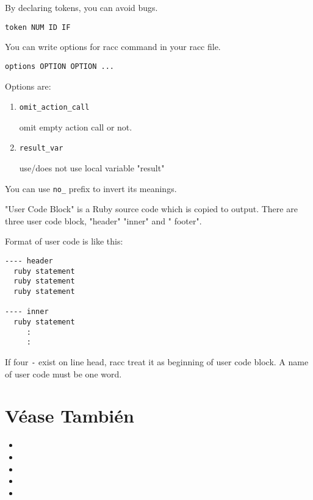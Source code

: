 By declaring tokens, you can avoid bugs. 

\begin{verbatim}
token NUM ID IF
\end{verbatim}


You can write options for racc command in your racc file.

\begin{verbatim}
options OPTION OPTION ...
\end{verbatim}
Options are:

\begin{enumerate}
\item
\begin{verbatim}
omit_action_call
\end{verbatim}
omit empty action call or not.

\item
\begin{verbatim}
result_var
\end{verbatim}
use/does not use local variable "result"
\end{enumerate}

You can use \verb'no_' prefix to invert its meanings.



"User Code Block" is a Ruby source code which is copied to output. There are three user code block, 
"header" 
"inner" 
and "
footer".

Format of user code is like this:

\begin{verbatim}
---- header
  ruby statement
  ruby statement
  ruby statement

---- inner
  ruby statement
     :
     :
\end{verbatim}
If four \verb'-' exist on line head, 
racc treat it as beginning of user code block. 
A name of user code must be one word.

\section{Véase También}

\begin{itemize}
\item
{}
\item
\item
{}
\item
{}
\item
{}
\end{itemize}
